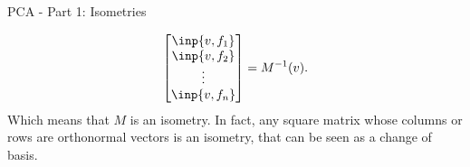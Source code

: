 \begin{entry}[2]{PCA - Part 1: Isometries }
\begin{entrysection}
\[\begin{bmatrix}\inp{v, f_1}\\\inp{v, f_2}\\\vdots\\\inp{v, f_n} \end{bmatrix} = M^{-1}(v).\] 
Which means that $M$ is an isometry. In fact, any square matrix whose columns or rows are orthonormal vectors is an isometry, that can be seen as a change of basis.
\end{entrysection}

\end{entry}
